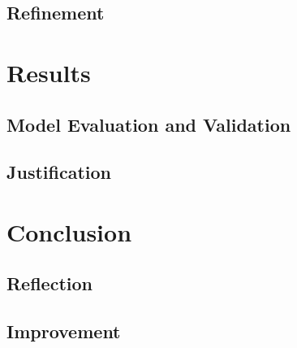 \section*{Refinement}


\chapter*{Results}


\section*{Model Evaluation and Validation}


\section*{Justification}



\chapter*{Conclusion}



\section*{Reflection}


\section*{Improvement}
